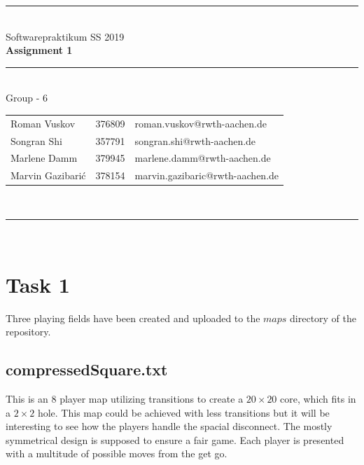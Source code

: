 \documentclass[a4paper,12pt]{article}
\begin{document}
\begin{center}
	\rule{\textwidth}{0.1pt}\\[1cm]
	
	\Large Softwarepraktikum SS 2019\\\bf Assignment 1
\end{center}


\begin{center}

	\rule{\textwidth}{0.1pt}\\[0.5cm]

	{\Large Group - 6\\[5mm]}

	\begin{tabular}{lll}

		Roman Vuskov & 376809 & roman.vuskov@rwth-aachen.de \\

		Songran Shi & 357791 & songran.shi@rwth-aachen.de \\

		Marlene Damm & 379945 & marlene.damm@rwth-aachen.de \\
		
		Marvin Gazibarić & 378154 & marvin.gazibaric@rwth-aachen.de \\

	\end{tabular}\\[0.5cm]

	\rule{\textwidth}{0.1pt}\\[1cm]

\end{center}


\section{Task 1}
Three playing fields have been created and uploaded to the $maps$ directory of the repository.

\subsection{compressedSquare.txt}

This is an $8$ player map utilizing transitions to create a $20\times20$ core, which fits in a $2\times2$ hole. This map could be achieved with less transitions but it will be interesting to see how the players handle the spacial disconnect. The mostly symmetrical design is supposed to ensure a fair game. Each player is presented with a multitude of possible moves from the get go.        
\end{document}
